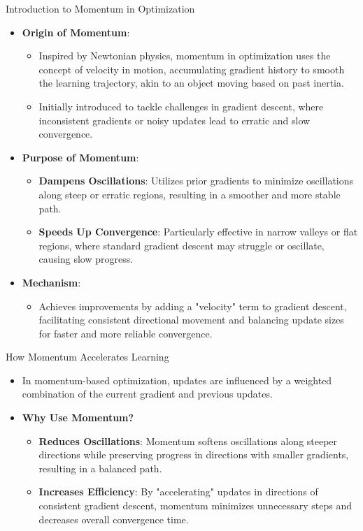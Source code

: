 \documentclass[serif, aspectratio=169]{beamer}
\begin{document}
\begin{frame}{Introduction to Momentum in Optimization}
    \begin{itemize}
        \item \textbf{Origin of Momentum}: 
        \begin{itemize}
            \item Inspired by Newtonian physics, momentum in optimization uses the concept of velocity in motion, accumulating gradient history to smooth the learning trajectory, akin to an object moving based on past inertia.
            \item Initially introduced to tackle challenges in gradient descent, where inconsistent gradients or noisy updates lead to erratic and slow convergence.
        \end{itemize}
        
        \item \textbf{Purpose of Momentum}: 
        \begin{itemize}
            \item \textbf{Dampens Oscillations}: Utilizes prior gradients to minimize oscillations along steep or erratic regions, resulting in a smoother and more stable path.
            \item \textbf{Speeds Up Convergence}: Particularly effective in narrow valleys or flat regions, where standard gradient descent may struggle or oscillate, causing slow progress.
        \end{itemize}
        
        \item \textbf{Mechanism}: 
        \begin{itemize}
            \item Achieves improvements by adding a "velocity" term to gradient descent, facilitating consistent directional movement and balancing update sizes for faster and more reliable convergence.
        \end{itemize}
    \end{itemize}
\end{frame}

\begin{frame}{How Momentum Accelerates Learning}
    \begin{itemize}
        \item In momentum-based optimization, updates are influenced by a weighted combination of the current gradient and previous updates.
        \item \textbf{Why Use Momentum?}
        \begin{itemize}
            \item \textbf{Reduces Oscillations}: Momentum softens oscillations along steeper directions while preserving progress in directions with smaller gradients, resulting in a balanced path.
            \item \textbf{Increases Efficiency}: By "accelerating" updates in directions of consistent gradient descent, momentum minimizes unnecessary steps and decreases overall convergence time.
        \end{itemize}
    \end{itemize}
\end{frame}
\end{document}
